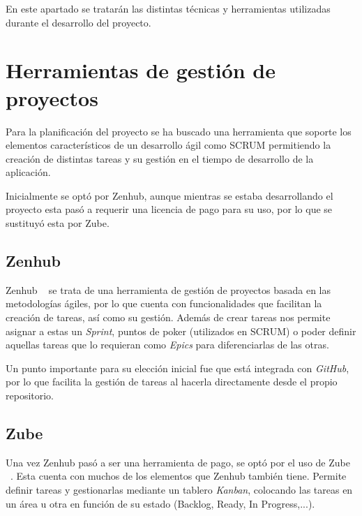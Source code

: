 
En este apartado se tratarán las distintas técnicas y herramientas utilizadas durante el desarrollo
del proyecto.

\section{Herramientas de gestión de proyectos}
Para la planificación del proyecto se ha buscado una herramienta que soporte
los elementos característicos de un desarrollo ágil como SCRUM permitiendo la creación
de distintas tareas y su gestión en el tiempo de desarrollo de la aplicación. 

Inicialmente se optó por Zenhub, aunque mientras se estaba desarrollando el proyecto
esta pasó a requerir una licencia de pago para su uso, por lo que se sustituyó esta
por Zube.

\subsection{Zenhub}
Zenhub ~\cite{zenhubZenhubProductivity} se trata de una herramienta de gestión de proyectos basada en las metodologías
ágiles, por lo que cuenta con funcionalidades que facilitan la creación de tareas, así como su gestión.
Además de crear tareas nos permite asignar a estas un \textit{Sprint}, puntos de poker (utilizados en SCRUM)
o poder definir aquellas tareas que lo requieran como \textit{Epics} para diferenciarlas de las otras.


Un punto importante para su elección inicial fue que está integrada con \textit{GitHub},
por lo que facilita la gestión de tareas al hacerla directamente desde el propio repositorio.
\subsection{Zube}
Una vez Zenhub pasó a ser una herramienta de pago, se optó por el uso de Zube ~\cite{zubeZubeAgile}. Esta cuenta con muchos
de los elementos que Zenhub también tiene. Permite definir tareas y gestionarlas mediante un tablero \textit{Kanban},
colocando las tareas en un área u otra en función de su estado (Backlog, Ready, In Progress,...).

